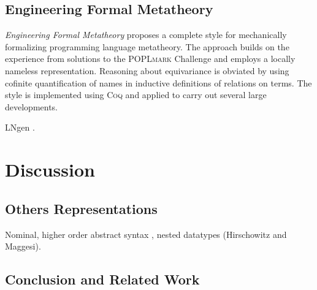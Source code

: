 \documentclass[a4paper,11pt]{article}
\newcommand{\name}[1]{\textsc{#1}\xspace}
\def\Coq{\name{Coq}}
\def\POPLmark{\name{POPLmark}}
\begin{document}
\subsection{Engineering Formal Metatheory}

\emph{Engineering Formal Metatheory} \cite{aydemir-et-al-08} proposes
a complete style for mechanically formalizing programming language
metatheory. The approach builds on the experience from solutions to
the \POPLmark Challenge and employs a locally nameless
representation. Reasoning about equivariance is obviated by using
cofinite quantification of names in inductive definitions of relations
on terms. The style is implemented using \Coq and applied to carry out
several large developments.

LNgen \cite{aydemir-weirich-09}.


\section{Discussion}\label{sec:discussion}

\subsection{Others Representations}

Nominal, higher order abstract syntax \cite{capretta-felty-06}, nested datatypes (Hirschowitz and Maggesi).


\subsection{Conclusion and Related Work}


\nocite{*} %


\end{document}
